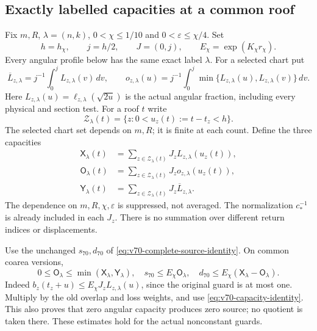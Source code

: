 \subsection{Exactly labelled capacities at a common roof}
Fix $m,R$, $\lambda=(n,k)$, $0<\chi\le1/10$ and
$0<\varepsilon\le\chi/4$. Set
\[
 h=h_\chi,\qquad j=h/2,\qquad J=(0,j),\qquad
 E_\chi=\exp(K_\chi r_\chi).
\]
Every angular profile below has the same exact label $\lambda$.
For a selected chart put
\[
 \overline L_{z,\lambda}=j^{-1}\int_0^jL_{z,\lambda}(v)\,dv,
 \qquad
 o_{z,\lambda}(u)=j^{-1}\int_0^j
                  \min\{L_{z,\lambda}(u),L_{z,\lambda}(v)\}\,dv.
\]
Here $L_{z,\lambda}(u)=\ell_{z,\lambda}(\sqrt{2u})$ is the
actual angular fraction, including every physical and section test.
For a roof $t$ write
\[
 \mathcal Z_\lambda(t)=\{z:0<u_z(t):=t-t_z<h\}.
\]
The selected chart set depends on $m,R$; it is finite at each count.
Define the three capacities
\begin{equation}\label{eq:v71-pooled-capacities}
 \begin{split}
 \mathsf X_\lambda(t)&=\sum_{z\in\mathcal Z_\lambda(t)}
                         J_zL_{z,\lambda}(u_z(t)),\\
 \mathsf O_\lambda(t)&=\sum_{z\in\mathcal Z_\lambda(t)}
                         J_zo_{z,\lambda}(u_z(t)),\\
 \mathsf Y_\lambda(t)&=\sum_{z\in\mathcal Z_\lambda(t)}
                         J_z\overline L_{z,\lambda}.
 \end{split}
\end{equation}
The dependence on $m,R,\chi,\varepsilon$ is suppressed, not averaged. The
normalization $c_*^{-1}$ is already included in each $J_z$. There
is no summation over different return indices or displacements.

Use the unchanged $s_{70},d_{70}$ of
\eqref{eq:v70-complete-source-identity}. On common coarea versions,
\begin{equation}\label{eq:v71-physical-capacity-bounds}
 0\le\mathsf O_\lambda\le\min(\mathsf X_\lambda,\mathsf Y_\lambda),
 \quad s_{70}\le E_\chi\mathsf O_\lambda,
 \quad d_{70}\le E_\chi(\mathsf X_\lambda-\mathsf O_\lambda).
\end{equation}
Indeed $b_z(t_z+u)\le E_\chi J_zL_{z,\lambda}(u)$, since the
original guard is at most one. Multiply by the old overlap and loss
weights, and use \eqref{eq:v70-capacity-identity}. This also proves
that zero angular capacity produces zero source; no quotient is taken
there. These estimates hold for the actual nonconstant guards.

